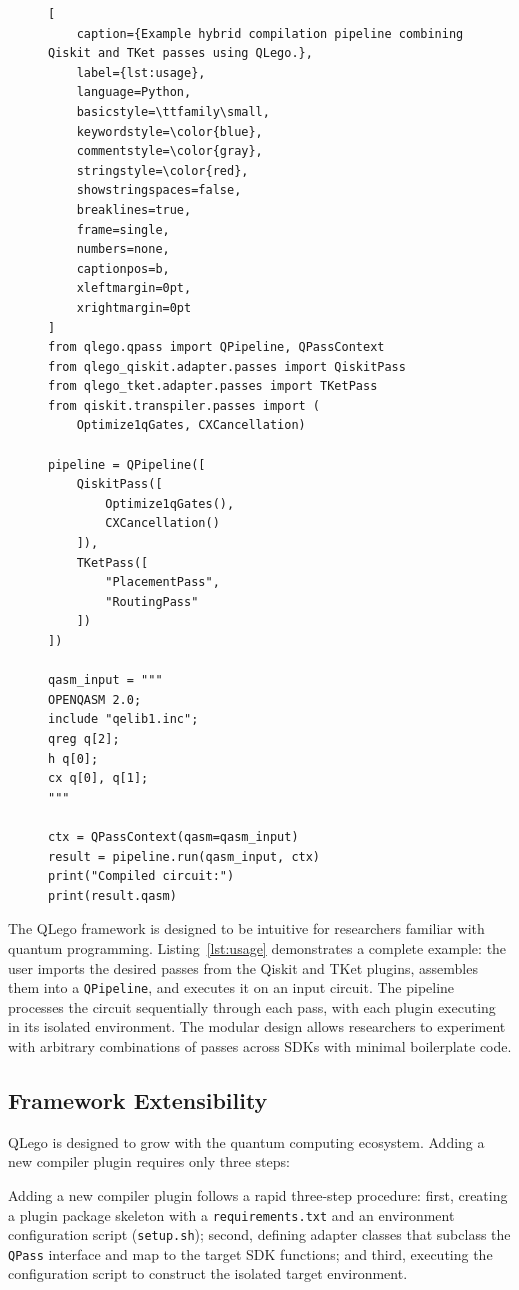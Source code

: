 \documentclass[conference]{IEEEtran}
\begin{document}
\begin{figure}[!t]
\begin{lstlisting}[
    caption={Example hybrid compilation pipeline combining Qiskit and TKet passes using QLego.}, 
    label={lst:usage}, 
    language=Python,
    basicstyle=\ttfamily\small,
    keywordstyle=\color{blue},
    commentstyle=\color{gray},
    stringstyle=\color{red},
    showstringspaces=false,
    breaklines=true,
    frame=single,
    numbers=none,
    captionpos=b,
    xleftmargin=0pt,
    xrightmargin=0pt
]
from qlego.qpass import QPipeline, QPassContext
from qlego_qiskit.adapter.passes import QiskitPass
from qlego_tket.adapter.passes import TKetPass
from qiskit.transpiler.passes import (
    Optimize1qGates, CXCancellation)

pipeline = QPipeline([
    QiskitPass([
        Optimize1qGates(),
        CXCancellation()
    ]),
    TKetPass([
        "PlacementPass",
        "RoutingPass"
    ])
])

qasm_input = """
OPENQASM 2.0;
include "qelib1.inc";
qreg q[2];
h q[0];
cx q[0], q[1];
"""

ctx = QPassContext(qasm=qasm_input)
result = pipeline.run(qasm_input, ctx)
print("Compiled circuit:")
print(result.qasm)
\end{lstlisting}
\end{figure}

The QLego framework is designed to be intuitive for researchers familiar with quantum programming. Listing~\ref{lst:usage} demonstrates a complete example: the user imports the desired passes from the Qiskit and TKet plugins, assembles them into a \texttt{QPipeline}, and executes it on an input circuit. The pipeline processes the circuit sequentially through each pass, with each plugin executing in its isolated environment. The modular design allows researchers to experiment with arbitrary combinations of passes across SDKs with minimal boilerplate code.

\subsection{Framework Extensibility}
\label{subsec:extensibility}

QLego is designed to grow with the quantum computing ecosystem. Adding a new compiler plugin requires only three steps:

Adding a new compiler plugin follows a rapid three-step procedure: first, creating a plugin package skeleton with a \texttt{requirements.txt} and an environment configuration script (\texttt{setup.sh}); second, defining adapter classes that subclass the \texttt{QPass} interface and map to the target SDK functions; and third, executing the configuration script to construct the isolated target environment.
\end{document}
